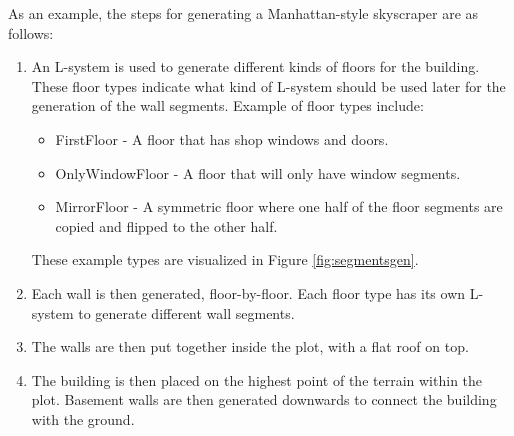 As an example, the steps for generating a Manhattan-style skyscraper are as follows:
\begin{enumerate}
    \item An L-system is used to generate different kinds of floors for the building. These floor types indicate what kind of L-system should be used later for the generation of the wall segments. Example of floor types include:
    \begin{itemize}
        \item FirstFloor - A floor that has shop windows and doors.
        \item OnlyWindowFloor - A floor that will only have window segments. 
        \item MirrorFloor - A symmetric floor where one half of the floor segments are copied and flipped to the other half.
    \end{itemize}
    These example types are visualized in Figure \ref{fig:segmentsgen}.
    \item Each wall is then generated, floor-by-floor. Each floor type has its own L-system to generate different wall segments.
    \item The walls are then put together inside the plot, with a flat roof on top.
    \item The building is then placed on the highest point of the terrain within the plot. Basement walls are then generated downwards to connect the building with the ground. %
\end{enumerate}



